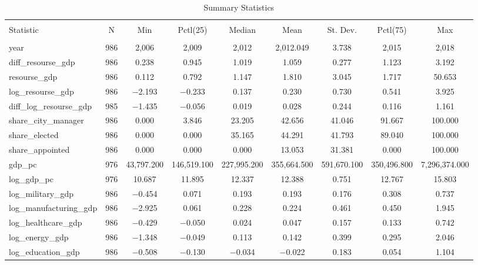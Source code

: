 \documentclass[12pt]{article}
\numberwithin{equation}{section}
\numberwithin{table}{section}
\numberwithin{figure}{section}
\begin{document}
\begin{table} \centering \footnotesize
  \caption{Summary Statistics} 
  \label{} 
\begin{tabular}{@{\extracolsep{5pt}}lcccccccc} 
\\[-1.8ex]\hline 
\hline \\[-1.8ex] 
Statistic & \multicolumn{1}{c}{N} & \multicolumn{1}{c}{Min} & \multicolumn{1}{c}{Pctl(25)} & \multicolumn{1}{c}{Median} & \multicolumn{1}{c}{Mean} & \multicolumn{1}{c}{St. Dev.} & \multicolumn{1}{c}{Pctl(75)} & \multicolumn{1}{c}{Max} \\ 
\hline \\[-1.8ex] 
year & 986 & 2,006 & 2,009 & 2,012 & 2,012.049 & 3.738 & 2,015 & 2,018 \\ 
diff\_resourse\_gdp & 986 & 0.238 & 0.945 & 1.019 & 1.059 & 0.277 & 1.123 & 3.192 \\ 
resourse\_gdp & 986 & 0.112 & 0.792 & 1.147 & 1.810 & 3.045 & 1.717 & 50.653 \\ 
log\_resourse\_gdp & 986 & $-$2.193 & $-$0.233 & 0.137 & 0.230 & 0.730 & 0.541 & 3.925 \\ 
diff\_log\_resourse\_gdp & 985 & $-$1.435 & $-$0.056 & 0.019 & 0.028 & 0.244 & 0.116 & 1.161 \\ 
share\_city\_manager & 986 & 0.000 & 3.846 & 23.205 & 42.656 & 41.046 & 91.667 & 100.000 \\ 
share\_elected & 986 & 0.000 & 0.000 & 35.165 & 44.291 & 41.793 & 89.040 & 100.000 \\ 
share\_appointed & 986 & 0.000 & 0.000 & 0.000 & 13.053 & 31.381 & 0.000 & 100.000 \\ 
gdp\_pc & 976 & 43,797.200 & 146,519.100 & 227,995.200 & 355,664.500 & 591,670.100 & 350,496.800 & 7,296,374.000 \\ 
log\_gdp\_pc & 976 & 10.687 & 11.895 & 12.337 & 12.388 & 0.751 & 12.767 & 15.803 \\ 
log\_military\_gdp & 986 & $-$0.454 & 0.071 & 0.193 & 0.193 & 0.176 & 0.308 & 0.737 \\ 
log\_manufacturing\_gdp & 986 & $-$2.925 & 0.061 & 0.228 & 0.224 & 0.461 & 0.450 & 1.945 \\ 
log\_healthcare\_gdp & 986 & $-$0.429 & $-$0.050 & 0.024 & 0.047 & 0.157 & 0.133 & 0.742 \\ 
log\_energy\_gdp & 986 & $-$1.348 & $-$0.049 & 0.113 & 0.142 & 0.399 & 0.295 & 2.046 \\ 
log\_education\_gdp & 986 & $-$0.508 & $-$0.130 & $-$0.034 & $-$0.022 & 0.183 & 0.054 & 1.104 \\ 

\end{tabular}
\end{table}
\end{document}
